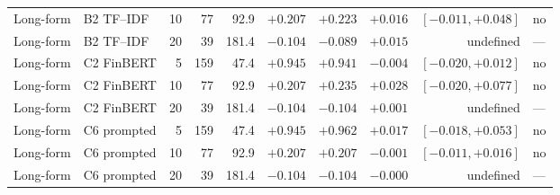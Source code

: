 \begin{table}[htbp]
\begin{tabular}{@{}llrrrrrrrl@{}}
Long-form    & B2 TF--IDF   & 10 &  77 &  92.9 & $+0.207$ & $+0.223$ & $+0.016$ & $[-0.011,+0.048]$ & no \\
Long-form    & B2 TF--IDF   & 20 &  39 & 181.4 & $-0.104$ & $-0.089$ & $+0.015$ & undefined & --- \\
Long-form    & C2 FinBERT   &  5 & 159 &  47.4 & $+0.945$ & $+0.941$ & $-0.004$ & $[-0.020,+0.012]$ & no \\
Long-form    & C2 FinBERT   & 10 &  77 &  92.9 & $+0.207$ & $+0.235$ & $+0.028$ & $[-0.020,+0.077]$ & no \\
Long-form    & C2 FinBERT   & 20 &  39 & 181.4 & $-0.104$ & $-0.104$ & $+0.001$ & undefined & --- \\
Long-form    & C6 prompted  &  5 & 159 &  47.4 & $+0.945$ & $+0.962$ & $+0.017$ & $[-0.018,+0.053]$ & no \\
Long-form    & C6 prompted  & 10 &  77 &  92.9 & $+0.207$ & $+0.207$ & $-0.001$ & $[-0.011,+0.016]$ & no \\
Long-form    & C6 prompted  & 20 &  39 & 181.4 & $-0.104$ & $-0.104$ & $-0.000$ & undefined & --- \\
\bottomrule
\end{tabular}
\end{table}

